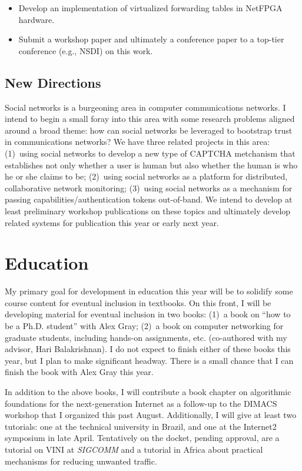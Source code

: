 \begin{sloppypar}
\begin{itemize}
\itemsep=-1pt
\item Develop an implementation of virtualized forwarding tables in
  NetFPGA hardware.  
\item Submit a workshop paper and ultimately a conference paper to a
  top-tier conference (e.g., NSDI) on this work.
\end{itemize}

\subsection*{New Directions}

Social networks is a burgeoning area in computer communications
networks.  I intend to begin a small foray into this area with some
research problems aligned around a broad theme: how can social networks
be leveraged to bootstrap trust in communications networks?  We have
three related projects in this area: (1)~using social networks to
develop a new type of CAPTCHA metchanism that establishes not only
whether a user is human but also whether the human is who he or she
claims to be; (2)~using social networks as a platform for distributed,
collaborative network monitoring; (3)~using social networks as a
mechanism for passing capabilities/authentication tokens out-of-band.
We intend to develop at least preliminary workshop publications on these
topics and ultimately develop related systems for publication this year
or early next year.

\section*{Education}

My primary goal for development in education this year will be to
solidify some course content for eventual inclusion in textbooks.  On
this front, I will be developing material for eventual inclusion in two
books: (1)~a book on ``how to be a Ph.D. student'' with Alex Gray; (2)~a
book on computer networking for graduate students, including hands-on
assignments, etc. (co-authored with my advisor, Hari Balakrishnan).  I
do not expect to finish either of these books this year, but I plan to
make significant headway.  There is a small chance that I can finish the
book with Alex Gray this year.


In addition to the above books, I will contribute a book chapter on
algorithmic foundations for the next-generation Internet as a follow-up
to the DIMACS workshop that I organized this past August.  Additionally,
I will give at least two tutorials: one at the technical university in
Brazil, and one at the Internet2 symposium in late April.  Tentatively
on the docket, pending approval, are a tutorial on VINI at {\em SIGCOMM}
and a tutorial in Africa about practical mechanisms for reducing
unwanted traffic.


\end{sloppypar}
